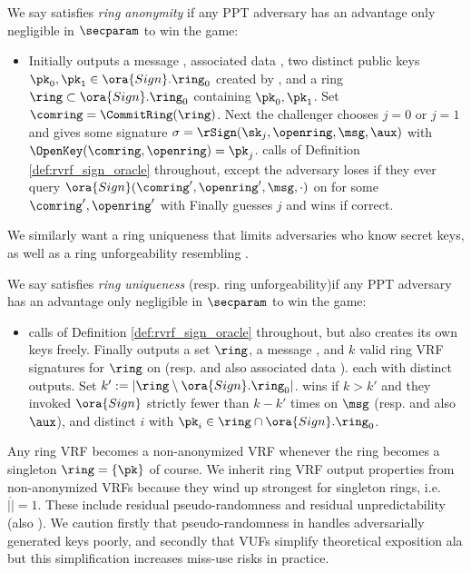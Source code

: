 \begin{definition}
We say \rVRF satisfies {\em ring anonymity} if
any PPT adversary \adv has an advantage only
 negligible in $\secparam$ to win the game:
\begin{itemize}
\item[]
 Initially \adv outputs a message \msg, associated data \aux,
 two distinct public keys $\pk_0,\pk_1 \in \ora{Sign}.\ring_0$ created by ,
 and a ring $\ring \subset \ora{Sign}.\ring_0$ containing $\pk_0,\pk_1$.
 Set $\comring = \CommitRing(\ring)$.
 Next the challenger chooses $j=0$ or $j=1$ and gives
  \adv some signature $\sigma = \rSign(\sk_j,\openring,\msg,\aux)$ with $\OpenKey(\comring,\openring) = \pk_j$.
 \adv calls  of Definition \ref{def:rvrf_sign_oracle} throughout,
 except the adversary \adv loses if they ever query $\ora{Sign}(\comring',\openring',\msg,\cdot)$
 on \msg for some $\comring',\openring'$ with
 \def\tmp{\OpenKey(\comring',\openring') \in \{ \pk_0, \pk_1 \}}
 \eprint{$\tmp$.}{$$ \tmp \mathperiod $$}
 Finally \adv guesses $j$ and wins if correct.
\end{itemize}
\end{definition}

We similarly want a ring uniqueness that limits adversaries who know secret keys,
as well as a ring unforgeability resembling \cite[pp. 7 Def. 7]{cryptoeprint:2005:304}. %

\begin{definition}
We say \rVRF satisfies {\em ring uniqueness} (resp. ring unforgeability)if
any PPT adversary \adv has an advantage only
 negligible in $\secparam$ to win the game:
\begin{itemize}
\item[]
 \adv calls  of Definition \ref{def:rvrf_sign_oracle} throughout,
 but also creates its own keys freely.
 Finally \adv outputs a set $\ring$, a message \msg, and $k$ valid
 ring VRF signatures for $\ring$ on \msg (resp. and also associated data \aux).
  each with distinct outputs.    %
 Set $k' := |\ring \setminus \ora{Sign}.\ring_0|$.
 \adv wins if $k > k'$ and they invoked $\ora{Sign}$ strictly fewer than
 $k - k'$ times on $\msg$ (resp. and also $\aux$), and
  distinct $i$ with $\pk_i \in \ring \cap \ora{Sign}.\ring_0$.
\end{itemize}
\end{definition}

Any ring VRF becomes a non-anonymized VRF whenever
 the ring becomes a singleton $\ring = \{ \pk \}$ of course.
We inherit ring VRF output properties from non-anonymized VRFs
because they wind up strongest for singleton rings, i.e. $|\ring| = 1$.
These include 
 residual pseudo-randomness \cite[Def. VRF (3) \S3.2, pp. 4]{vrf_micali} and
 residual unpredictability \cite[Def. VUF (3) \S3.2, pp. 5]{vrf_micali}
  (also \cite[Def. 4, pp. 8]{agg_dkg}).
%
We caution firstly that pseudo-randomness in \cite{vrf_micali} handles
adversarially generated keys poorly, and
secondly that VUFs simplify theoretical exposition ala \cite{agg_dkg}
but this simplification increases miss-use risks in practice.

